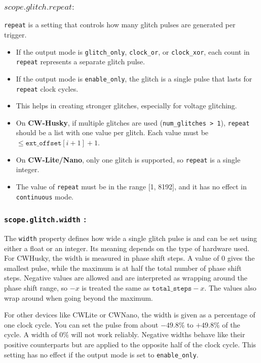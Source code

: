 \subsubsection{$scope.glitch.repeat :$}
\texttt{repeat} is a setting that controls how many glitch pulses are generated per trigger.

\begin{itemize}
    \item If the output mode is \texttt{glitch\_only}, \texttt{clock\_or}, or \texttt{clock\_xor}, each count in \texttt{repeat} represents a separate glitch pulse.
    
    \item If the output mode is \texttt{enable\_only}, the glitch is a single pulse that lasts for \texttt{repeat} clock cycles.
    
    \item This helps in creating stronger glitches, especially for voltage glitching.
    
    \item On \textbf{CW-Husky}, if multiple glitches are used (\texttt{num\_glitches > 1}), \texttt{repeat} should be a list with one value per glitch. Each value must be $\leq \texttt{ext\_offset}[i+1] + 1$.
    
    \item On \textbf{CW-Lite/Nano}, only one glitch is supported, so \texttt{repeat} is a single integer.
    
    \item The value of \texttt{repeat} must be in the range [1, 8192], and it has no effect in \texttt{continuous} mode.
\end{itemize}
\subsubsection{\textbf{\texttt{scope.glitch.width} :}} 
The \texttt{width} property defines how wide a single glitch pulse is and can be set using either a float or an integer. Its meaning depends on the type of hardware used. For CWHusky, the width is measured in phase shift steps. A value of 0 gives the smallest pulse, while the maximum is at half the total number of phase shift steps. Negative values are allowed and are interpreted as wrapping around the phase shift range, so $-x$ is treated the same as $\texttt{total\_steps} - x$. The values also wrap around when going beyond the maximum.

For other devices like CWLite or CWNano, the width is given as a percentage of one clock cycle. You can set the pulse from about $-49.8\%$ to $+49.8\%$ of the cycle. A width of $0\%$ will not work reliably. Negative widths behave like their positive counterparts but are applied to the opposite half of the clock cycle. This setting has no effect if the output mode is set to \texttt{enable\_only}.

